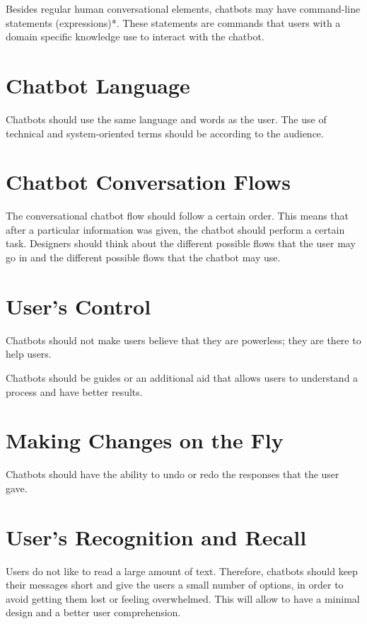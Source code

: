 \documentclass[a4paper,10pt]{article}
\begin{document}
 Besides regular human conversational elements, chatbots may have command-line statements (expressions)*. These statements are commands that users with a domain specific knowledge use to interact with the chatbot.
 
 \section{Chatbot Language}
 
 Chatbots should use the same language and words as the user. The use of technical and system-oriented terms should be according to the audience. 

\section{Chatbot Conversation Flows}

The conversational chatbot flow should follow a certain order. This means that after a particular information was given, the chatbot should perform a certain task. Designers should think about the different possible flows that the user may go in and the different possible flows that the chatbot may use.  

\section{User's Control}

Chatbots should not make users believe that they are powerless; they are there to help users.

Chatbots should be guides or an additional aid that allows users to understand a process and have better results.

\section{Making Changes on the Fly}

Chatbots should have the ability to undo or redo the responses that the user gave.

\section{User's Recognition and Recall}

Users do not like to read a large amount of text. Therefore, chatbots should keep their messages short and give the users a small number of options, in order to avoid getting them lost or feeling overwhelmed. This will allow to have a minimal design and a better user comprehension.
\end{document}
